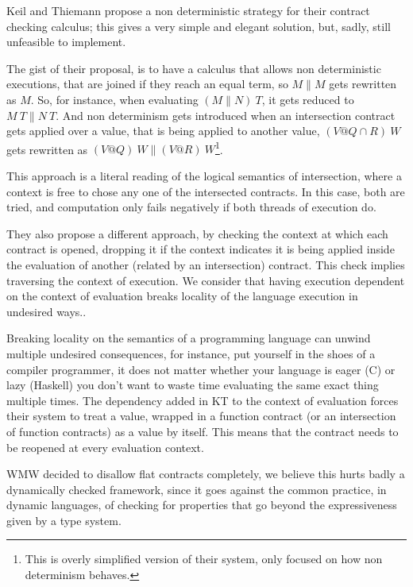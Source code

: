 Keil and Thiemann propose a non deterministic strategy for their contract checking
calculus; this gives a very simple and elegant solution, but, sadly, still
unfeasible to implement.

The gist of their proposal, is to have a calculus that allows non deterministic
executions, that are joined if they reach an equal term, so $M \parallel M$ gets
rewritten as $M$.
So, for instance, when evaluating $(M \parallel N) ~ T$, it gets
reduced to $ M ~ T \parallel N ~ T$.
And non determinism gets introduced when an intersection contract gets applied
over a value, that is being applied to another value, $(V @ Q \cap R) ~ W$
gets rewritten as $(V @ Q) ~ W \parallel (V @ R) ~ W$\footnote{This is overly
simplified version of their system, only focused on how non determinism behaves.}.

This approach is a literal reading of the logical semantics of intersection, where
a context is free to chose any one of the intersected contracts.
In this case, both are tried, and computation only fails negatively if both
threads of execution do.

They also propose a different approach, by checking the context at which
each contract is opened, dropping
it if the context indicates it is being applied inside the evaluation of another
(related by an intersection) contract.
This check implies traversing the context of execution.
We consider that having execution dependent on the context
of evaluation breaks locality of
the language execution in undesired ways..

Breaking locality on the semantics of a programming language can unwind
multiple undesired consequences, for instance, put yourself in the shoes
of a compiler programmer, it does not matter whether your language is eager
(C) or lazy (Haskell) you don't want to waste time evaluating
the same exact thing multiple times.
The dependency added in KT to the context of evaluation forces their system
to treat a value, wrapped in a function contract (or an intersection of function
contracts) as a value by itself. This means that the contract needs to be reopened
at every evaluation context.

WMW decided to disallow flat contracts completely,
we believe this hurts badly a dynamically checked framework, since it goes against
the common practice, in dynamic languages, of checking for properties
that go beyond the expressiveness given by a type system.

